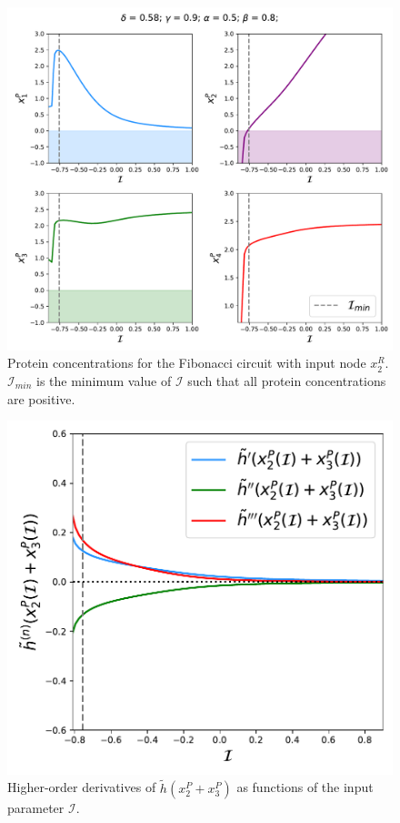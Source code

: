 \begin{figure}[H]
    \centering
    \includegraphics[scale=0.46]{figs/numerics/fibo_x2r_case3.pdf}
    \caption{Protein concentrations for the Fibonacci circuit with input node $x_2^R$.
    $\mathcal{I}_{min}$ is the minimum value of $\mathcal{I}$
    such that all protein concentrations are positive.}
    \label{fig:case3-fibo-chair}
\end{figure}

\begin{figure}[H]
    \centering
    \includegraphics[scale=0.5]{figs/numerics/fibo_x2r_case3_h_derivative.pdf}
    \caption{Higher-order derivatives of $\tilde{h}(x_2^P + x_3^P)$ as functions of the input 
    parameter $\mathcal{I}$.}
    \label{fig:case3-fibo-hderivative}
\end{figure}

